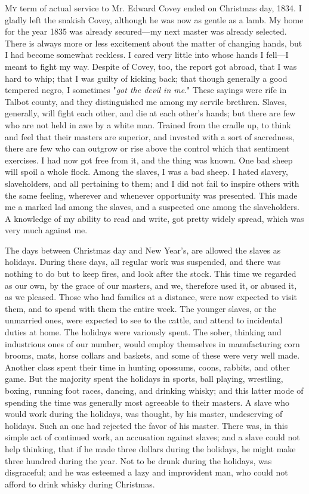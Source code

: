 \textsc{My} term of actual service to Mr. Edward Covey ended on
Christmas day, 1834. I gladly left the snakish Covey, although he was
now as gentle as a lamb. My home for the year 1835 was already
secured---my next master was already selected. There is always more or
less excitement about the matter of changing hands, but I had become
somewhat reckless. I cared very little into whose hands I fell---I meant
to fight my way. Despite of Covey, too, the report got abroad, that I
was hard to whip; that I was guilty of kicking back; that though
generally a good tempered negro, I sometimes "\emph{got the devil in
me}." These sayings were rife in Talbot county, and they distinguished
me among my servile brethren. Slaves,
{\protect\hypertarget{251}{}{}}generally, will fight each other, and die
at each other's hands; but there are few who are not held in awe by a
white man. Trained from the cradle up, to think and feel that their
masters are superior, and invested with a sort of sacredness, there are
few who can outgrow or rise above the control which that sentiment
exercises. I had now got free from it, and the thing was known. One bad
sheep will spoil a whole flock. Among the slaves, I was a bad sheep. I
hated slavery, slaveholders, and all pertaining to them; and I did not
fail to inspire others with the same feeling, wherever and whenever
opportunity was presented. This made me a marked lad among the slaves,
and a suspected one among the slaveholders. A knowledge of my ability to
read and write, got pretty widely spread, which was very much against
me.

The days between Christmas day and New Year's, are allowed the slaves as
holidays. During these days, all regular work was suspended, and there
was nothing to do but to keep fires, and look after the stock. This time
we regarded as our own, by the grace of our masters, and we, therefore
used it, or abused it, as we pleased. Those who had families at a
distance, were now expected to visit them, and to spend with them the
entire week. The younger slaves, or the unmarried ones, were expected to
see to the cattle, and attend to incidental duties at home. The holidays
were variously spent. The sober, thinking and industrious ones of our
number, would employ themselves in manufacturing corn brooms, mats,
horse collars and baskets, and some of these were very well made.
Another class spent their time in hunting
{\protect\hypertarget{252}{}{}}opossums, coons, rabbits, and other game.
But the majority spent the holidays in sports, ball playing, wrestling,
boxing, running foot races, dancing, and drinking whisky; and this
latter mode of spending the time was generally most agreeable to their
masters. A slave who would work during the holidays, was thought, by his
master, undeserving of holidays. Such an one had rejected the favor of
his master. There was, in this simple act of continued work, an
accusation against slaves; and a slave could not help thinking, that if
he made three dollars during the holidays, he might make three hundred
during the year. Not to be drunk during the holidays, was disgraceful;
and he was esteemed a lazy and improvident man, who could not afford to
drink whisky during Christmas.

